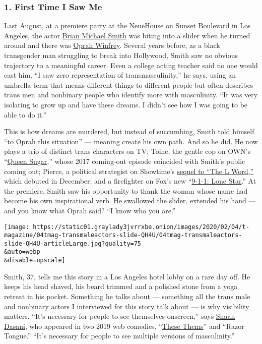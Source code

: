 \hypertarget{1-first-time-i-saw-me}{%
\subsubsection{1. First Time I Saw Me}\label{1-first-time-i-saw-me}}

Last August, at a premiere party at the NeueHouse on Sunset Boulevard in
Los Angeles, the actor \href{https://www.thebrianmichael.com/}{Brian
Michael Smith} was biting into a slider when he turned around and there
was
\href{https://www.nytimes3xbfgragh.onion/topic/person/oprah-winfrey}{Oprah
Winfrey}. Several years before, as a black transgender man struggling to
break into Hollywood, Smith saw no obvious trajectory to a meaningful
career. Even a college acting teacher said no one would cast him. ``I
saw zero representation of transmasculinity,'' he says, using an
umbrella term that means different things to different people but often
describes trans men and nonbinary people who identify more with
masculinity. ``It was very isolating to grow up and have these dreams. I
didn't see how I was going to be able to do it.''

This is how dreams are murdered, but instead of succumbing, Smith told
himself ``to Oprah this situation'' --- meaning create his own path. And
so he did. He now plays a trio of distinct trans characters on TV:
Toine, the gentle cop on OWN's
``\href{https://www.nytimes3xbfgragh.onion/watching/titles/queen-sugar}{Queen
Sugar},'' whose 2017 coming-out episode coincided with Smith's public
coming out; Pierce, a political strategist on Showtime's
\href{https://www.nytimes3xbfgragh.onion/2019/11/29/arts/television/l-word-generation-q.html}{sequel
to ``The L Word,''} which debuted in December; and a firefighter on
Fox's new
``\href{https://www.nytimes3xbfgragh.onion/2020/01/02/arts/television/50-shows-to-watch.html}{9-1-1:
Lone Star}.'' At the premiere, Smith saw his opportunity to thank the
woman whose name had become his own inspirational verb. He swallowed the
slider, extended his hand --- and you know what Oprah said? ``I know who
you are.''

\texttt{[image: https://static01.graylady3jvrrxbe.onion/images/2020/02/04/t-magazine/04tmag-transmaleactors-slide-QH4U/04tmag-transmaleactors-slide-QH4U-articleLarge.jpg?quality=75\\\&auto=webp\\\&disable=upscale]}

Smith, 37, tells me this story in a Los Angeles hotel lobby on a rare
day off. He keeps his head shaved, his beard trimmed and a polished
stone from a yoga retreat in his pocket. Something he talks about ---
something all the trans male and nonbinary actors I interviewed for this
story talk about --- is why visibility matters. ``It's necessary for
people to see themselves onscreen,'' says
\href{https://www.shaandasani.com/}{Shaan Dasani}, who appeared in two
2019 web comedies, ``\href{http://www.thesethems.com/}{These Thems}''
and ``Razor Tongue.'' ``It's necessary for people to see multiple
versions of masculinity.''

